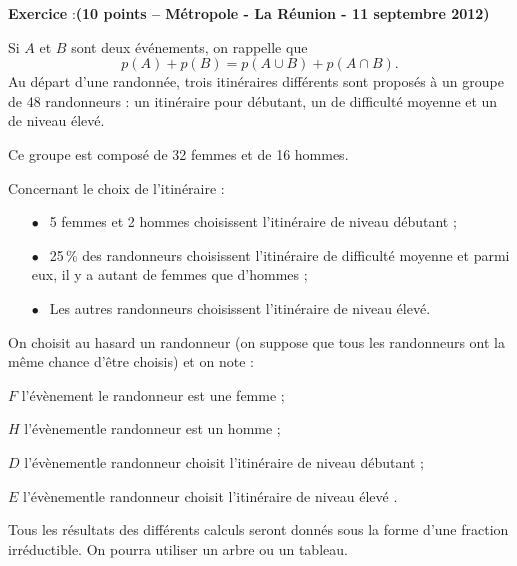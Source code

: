 \documentclass[12pt,french]{article}
\newcounter{exoc}
\newenvironment{exoc}[1]{%
  \refstepcounter{exoc}\textbf{Exercice \theexoc} :\hfill {\footnotesize\textbf{(#1)}}\par
  \medskip}%
{\medskip}
\begin{document}
\begin{exoc}{10 points -- Métropole - La Réunion - 11 septembre 2012}
    Si $A$ et $B$ sont deux événements, on rappelle que \[p(A) + p(B) = p(A \cup B) + p(A \cap B).\]
    Au départ d'une randonnée, trois itinéraires différents sont proposés à un groupe de 48 randonneurs : un itinéraire pour débutant, un de difficulté moyenne et un de niveau élevé.\par
    Ce groupe est composé de 32 femmes et de 16 hommes.\par
    Concernant le choix de l'itinéraire :
     \setlength\parindent{6mm}
         \begin{itemize}
            \item[$\bullet~~$] 5 femmes et 2 hommes choisissent l'itinéraire de niveau débutant ;
            \item[$\bullet~~$] 25\,\% des randonneurs choisissent l'itinéraire de difficulté moyenne et parmi eux, il y a autant de femmes que d'hommes ;
            \item[$\bullet~~$] Les autres randonneurs choisissent l'itinéraire de niveau élevé.
        \end{itemize}
     \setlength\parindent{0mm}

    On choisit au hasard un randonneur (on suppose que tous les randonneurs ont la même chance d'être choisis) et on note :\par
        $F$ l'évènement \og le randonneur est une femme \fg{} ;\par
        $H$ l'évènement\og le randonneur est un homme \fg{} ;\par
        $D$ l'évènement\og le randonneur choisit l'itinéraire de niveau débutant \fg{} ;\par
        $E$ l'évènement\og le randonneur choisit l'itinéraire de niveau élevé \fg.\par\medskip

    Tous les résultats des différents calculs seront donnés sous la forme d'une fraction irréductible. On pourra utiliser un arbre ou un tableau.\par\medskip


\end{exoc}
\end{document}
